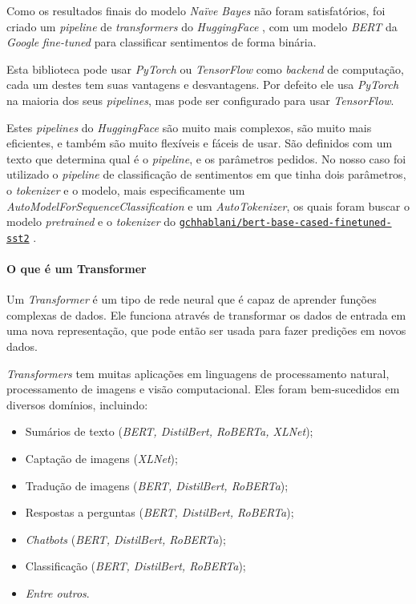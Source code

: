 Como os resultados finais do modelo \textit{Naïve Bayes} não foram satisfatórios, foi criado um \textit{pipeline} de \textit{transformers} do \textit{HuggingFace} \cite{yt2}, com um modelo \textit{BERT} da \textit{Google} \textit{fine-tuned} para classificar sentimentos de forma binária.

Esta biblioteca pode usar \textit{PyTorch} ou \textit{TensorFlow} como \textit{backend} de computação, cada um destes tem suas vantagens e desvantagens. Por defeito ele usa \textit{PyTorch} na maioria dos seus \textit{pipelines}, mas pode ser configurado para usar \textit{TensorFlow}.

Estes \textit{pipelines} do \textit{HuggingFace} são muito mais complexos, são muito mais eficientes, e também são muito flexíveis e fáceis de usar\cite{yt2}. São definidos com um texto que determina qual é o \textit{pipeline}, e os parâmetros pedidos. No nosso caso foi utilizado o \textit{pipeline} de classificação de sentimentos em que tinha dois parâmetros, o \textit{tokenizer} e o modelo, mais especificamente um \textit{AutoModelForSequenceClassification} e um \textit{AutoTokenizer}, os quais foram buscar o modelo \textit{pretrained} e o \textit{tokenizer} do \href{https://huggingface.co/gchhablani/bert-base-cased-finetuned-sst2}{\texttt{gchhablani/bert-base-cased-finetuned-sst2}} \cite{yt2}.

\paragraph{O que é um Transformer\\}

Um \textit{Transformer} é um tipo de rede neural que é capaz de aprender funções complexas de dados. Ele funciona através de transformar os dados de entrada em uma nova representação, que pode então ser usada para fazer predições em novos dados.

\textit{Transformers} tem muitas aplicações em linguagens de processamento natural, processamento de imagens e visão computacional. Eles foram bem-sucedidos em diversos domínios, incluindo:
\begin{itemize}
  \setlength\itemsep{0.05em}
    \item Sumários de texto (\textit{BERT, DistilBert, RoBERTa, XLNet});
    \item Captação de imagens (\textit{XLNet});
    \item Tradução de imagens (\textit{BERT, DistilBert, RoBERTa});
    \item Respostas a perguntas (\textit{BERT, DistilBert, RoBERTa});
    \item \textit{Chatbots} (\textit{BERT, DistilBert, RoBERTa});
    \item Classificação (\textit{BERT, DistilBert, RoBERTa});
    \item \textit{Entre outros}.
\end{itemize}

